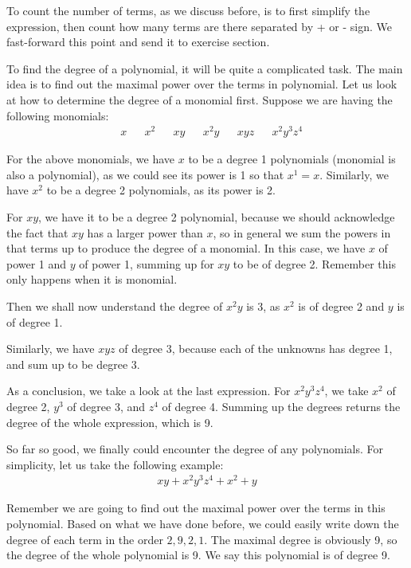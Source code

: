 \documentclass[12pt]{article}
\begin{document}
    To count the number of terms, as we discuss before, is to first simplify the expression, then count how many terms are there separated by + or - sign. We fast-forward this point and send it to exercise section.

    To find the degree of a polynomial, it will be quite a complicated task. The main idea is to find out the maximal power over the terms in polynomial. Let us look at how to determine the degree of a monomial first. Suppose we are having the following monomials:\begin{align*}
        &x&&x^2&&xy&&x^2y&&xyz&&x^2y^3z^4
    \end{align*}

    For the above monomials, we have $x$ to be a degree 1 polynomials (monomial is also a polynomial), as we could see its power is 1 so that $x^1=x$. Similarly, we have $x^2$ to be a degree 2 polynomials, as its power is 2.

    For $xy$, we have it to be a degree 2 polynomial, because we should acknowledge the fact that $xy$ has a larger power than $x$, so in general we sum the powers in that terms up to produce the degree of a monomial. In this case, we have $x$ of power 1 and $y$ of power 1, summing up for $xy$ to be of degree 2. Remember this only happens when it is monomial.

    Then we shall now understand the degree of $x^2y$ is 3, as $x^2$ is of degree 2 and $y$ is of degree 1.

    Similarly, we have $xyz$ of degree 3, because each of the unknowns has degree 1, and sum up to be degree 3.

    As a conclusion, we take a look at the last expression. For $x^2y^3z^4$, we take $x^2$ of degree 2, $y^3$ of degree 3, and $z^4$ of degree 4. Summing up the degrees returns the degree of the whole expression, which is 9.

    So far so good, we finally could encounter the degree of any polynomials. For simplicity, let us take the following example:\begin{align*}
        xy+x^2y^3z^4+x^2+y
    \end{align*}

    Remember we are going to find out the maximal power over the terms in this polynomial. Based on what we have done before, we could easily write down the degree of each term in the order $2,9,2,1$. The maximal degree is obviously 9, so the degree of the whole polynomial is 9. We say this polynomial is of degree 9.
\end{document}
